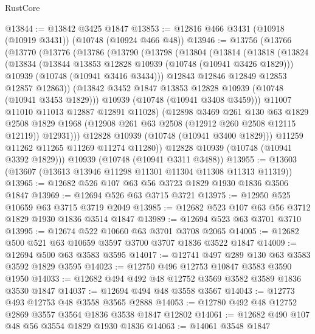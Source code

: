\begin{lexlean}{RustCore}
\begin{coremodule}
@13844 := @13842 @3425 @1847
@13853 := @12816 @466 @3431 (@10918 (@10919 @3431)) (@10748 (@10924 @466 @48))
@13946 := @13756
    (@13766
      (@13770
        (@13776
          (@13786
            (@13790
              (@13798
                (@13804
                  (@13814
                    (@13818
                      (@13824
                        (@13834
                          (@13844 @13853 @12828 @10939 (@10748 (@10941 @3426 @1829)))
                          @10939
                          (@10748 (@10941 @3416 @3434)))
                        @12843
                        @12846
                        @12849
                        @12853
                        @12857
                        @12863))
                    (@13842 @3452 @1847 @13853 @12828 @10939 (@10748 (@10941 @3453 @1829)))
                    @10939
                    (@10748 (@10941 @3408 @3459)))
                  @11007
                  @11010
                  @11013
                  @12887
                  @12891
                  @11028)
                (@12898
                  @3469
                  @261
                  @130
                  @63
                  @1829
                  @2508
                  @1829
                  @1968
                  (@12908 @261 @63 @2508 (@12912 @260 @2508 @12115 @12119))
                  @12931)))
            @12828
            @10939
            (@10748 (@10941 @3400 @1829)))
          @11259
          @11262
          @11265
          @11269
          @11274
          @11280))
      @12828
      @10939
      (@10748 (@10941 @3392 @1829)))
    @10939
    (@10748 (@10941 @3311 @3488))
@13955 := @13603 (@13607 (@13613 @13946 @11298 @11301 @11304 @11308 @11313 @11319))
@13965 := @12682 @526 @107 @63 @56 @3723 @1829 @1930 @1836 @3506 @1847
@13969 := @12694 @526 @63 @3715 @3721
@13975 := @12950 @525 @10659 @63 @3715 @3719 @2049
@13985 := @12682 @523 @107 @63 @56 @3712 @1829 @1930 @1836 @3514 @1847
@13989 := @12694 @523 @63 @3701 @3710
@13995 := @12674 @522 @10660 @63 @3701 @3708 @2065
@14005 := @12682 @500 @521 @63 @10659 @3597 @3700 @3707 @1836 @3522 @1847
@14009 := @12694 @500 @63 @3583 @3595
@14017 := @12741 @497 @289 @130 @63 @3583 @3592 @1829 @3595
@14023 := @12750 @496 @12753 @10847 @3583 @3590 @1950
@14033 := @12682 @494 @492 @48 @12752 @3569 @3582 @3589 @1836 @3530 @1847
@14037 := @12694 @494 @48 @3558 @3567
@14043 := @12773 @493 @12753 @48 @3558 @3565 @2888
@14053 := @12780 @492 @48 @12752 @2869 @3557 @3564 @1836 @3538 @1847 @12802
@14061 := @12682 @490 @107 @48 @56 @3554 @1829 @1930 @1836
@14063 := @14061 @3548 @1847

\end{coremodule}
\end{lexlean}
